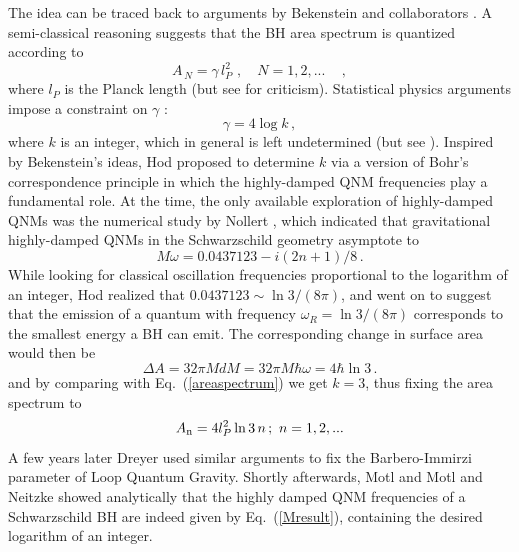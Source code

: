 \documentclass[]{iopart}
\def\be{\begin{equation}}
\def\ee{\end{equation}}
\begin{document}
The idea can be traced back to arguments by Bekenstein and collaborators
\cite{Bekenstein:1974jk,Bekenstein:1995ju}. A semi-classical reasoning
suggests that the BH area spectrum is quantized according to
%
\be
A_{\,N}=\gamma\, l_{P}^2\, \,,\quad N=1,2,...\quad\,,
\label{areaspectrum}
\ee
%
where $l_{P}$ is the Planck length (but see \cite{Khriplovich:2004fd} for
criticism).  Statistical physics arguments impose a constraint on $\gamma$
\cite{Bekenstein:1995ju,Bekenstein:1973ur}:
%
\be
\gamma=4 \log k\,,
\label{areaspectrum1}
\ee
%
where $k$ is an integer, which in general is left undetermined (but see
\cite{Bekenstein:1998aw}). Inspired by Bekenstein's ideas, Hod
\cite{Hod:1998vk} proposed to determine $k$ via a version of Bohr's
correspondence principle in which the highly-damped QNM frequencies play a
fundamental role.
At the time, the only available exploration of highly-damped QNMs was the
numerical study by Nollert \cite{Nollert:1993}, which indicated that
gravitational highly-damped QNMs in the Schwarzschild geometry asymptote to
%
\be
M\omega =0.0437123-i(2n+1)/8\,.
\label{asymptQNnollert}
\ee
%
While looking for classical oscillation frequencies proportional to the
logarithm of an integer, Hod realized that $0.0437123 \sim \ln3/(8\pi)$, and
went on to suggest that the emission of a quantum with frequency
$\omega_R=\ln3/(8\pi)$ corresponds to the smallest energy a BH can emit.  The
corresponding change in surface area would then be
%
\be
\Delta A= 32\pi MdM=32\pi M{\hbar} \omega= 4{\hbar}\ln 3 \,.
\label{surfacearea}
\ee
%
and by comparing with Eq.~(\ref{areaspectrum}) we get $k=3$, thus fixing the
area spectrum to
%
\be
A_{\rm n}=4l_{P}^2\ln{3}\,  n\,;\,\,n=1,2,...
\label{areaspectrumfinal}
\ee
% 
A few years later Dreyer \cite{Dreyer:2002vy} used similar arguments to fix
the Barbero-Immirzi parameter of Loop Quantum Gravity. Shortly afterwards,
Motl \cite{Motl:2002hd} and Motl and Neitzke \cite{Motl:2003cd} showed
analytically that the highly damped QNM frequencies of a Schwarzschild BH are
indeed given by Eq.~(\ref{Mresult}), containing the desired logarithm of an
integer.
\end{document}
